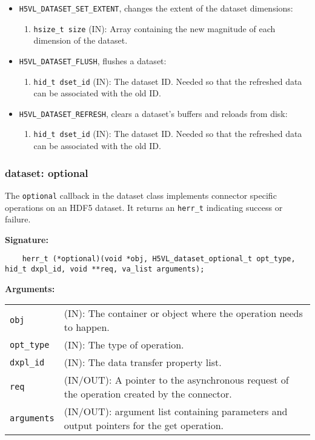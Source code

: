 \begin{itemize}
\item \texttt{H5VL\_DATASET\_SET\_EXTENT}, changes the extent of the dataset dimensions:
  \begin{enumerate}
  \item \texttt{hsize\_t size} (IN): Array containing the new magnitude of each dimension of the dataset. 
  \end{enumerate}
\item \texttt{H5VL\_DATASET\_FLUSH}, flushes a dataset:
  \begin{enumerate}
  \item \texttt{hid\_t dset\_id} (IN): The dataset ID. Needed so that the refreshed data can be associated with the old ID. 
  \end{enumerate}
\item \texttt{H5VL\_DATASET\_REFRESH}, clears a dataset's buffers and reloads from disk:
  \begin{enumerate}
  \item \texttt{hid\_t dset\_id} (IN): The dataset ID. Needed so that the refreshed data can be associated with the old ID. 
  \end{enumerate}
\end{itemize}

\subsubsection{dataset: optional}
The \texttt{optional} callback in the dataset class implements connector specific operations on an HDF5 dataset. It returns an \texttt{herr\_t} indicating success or failure. \bigskip

\begin{mdframed}[style=bgbox]
\textbf{Signature:}
\begin{lstlisting}
    herr_t (*optional)(void *obj, H5VL_dataset_optional_t opt_type, hid_t dxpl_id, void **req, va_list arguments);
\end{lstlisting}

\textbf{Arguments:}\\
\begin{tabular}{l p{13.5cm}}
  \texttt{obj} & (IN): The container or object where the operation needs to happen.\\
  \texttt{opt\_type} & (IN): The type of operation.\\
  \texttt{dxpl\_id} & (IN): The data transfer property list.\\
  \texttt{req} & (IN/OUT): A pointer to the asynchronous request of the operation created by the connector.\\
  \texttt{arguments} & (IN/OUT): argument list containing parameters and output pointers for the get operation. \\
\end{tabular}
\end{mdframed}

